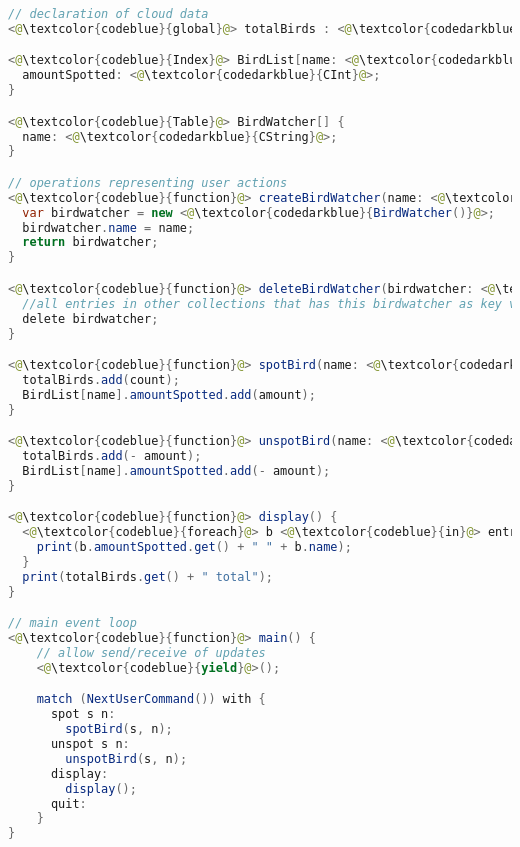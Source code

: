 %

\begin{lstlisting}[language=Java,caption={A simple birdwatching application implemented in a typed javascript-like pseudo-language},label={lst:birdwatching}]
// declaration of cloud data
<@\textcolor{codeblue}{global}@> totalBirds : <@\textcolor{codedarkblue}{CInt}@>;

<@\textcolor{codeblue}{Index}@> BirdList[name: <@\textcolor{codedarkblue}{String}@>] {
  amountSpotted: <@\textcolor{codedarkblue}{CInt}@>;
}

<@\textcolor{codeblue}{Table}@> BirdWatcher[] {
  name: <@\textcolor{codedarkblue}{CString}@>;
}

// operations representing user actions
<@\textcolor{codeblue}{function}@> createBirdWatcher(name: <@\textcolor{codedarkblue}{String}@>) {
  var birdwatcher = new <@\textcolor{codedarkblue}{BirdWatcher()}@>;
  birdwatcher.name = name;
  return birdwatcher;
}

<@\textcolor{codeblue}{function}@> deleteBirdWatcher(birdwatcher: <@\textcolor{codedarkblue}{BirdWatcher}@>) {
  //all entries in other collections that has this birdwatcher as key value, will also be deleted
  delete birdwatcher;
}

<@\textcolor{codeblue}{function}@> spotBird(name: <@\textcolor{codedarkblue}{String}@>, amount: <@\textcolor{codedarkblue}{Int}@>) {
  totalBirds.add(count);
  BirdList[name].amountSpotted.add(amount);
}

<@\textcolor{codeblue}{function}@> unspotBird(name: <@\textcolor{codedarkblue}{String}@>, amount: <@\textcolor{codedarkblue}{Int}@>) {
  totalBirds.add(- amount);
  BirdList[name].amountSpotted.add(- amount);
}

<@\textcolor{codeblue}{function}@> display() {
  <@\textcolor{codeblue}{foreach}@> b <@\textcolor{codeblue}{in}@> entries BirdList.amountSpotted {
    print(b.amountSpotted.get() + " " + b.name);
  }
  print(totalBirds.get() + " total");
}

// main event loop
<@\textcolor{codeblue}{function}@> main() {
    // allow send/receive of updates
    <@\textcolor{codeblue}{yield}@>();

    match (NextUserCommand()) with {
      spot s n:
        spotBird(s, n);
      unspot s n:
        unspotBird(s, n);
      display:
        display();
      quit:
    } 
}
\end{lstlisting}